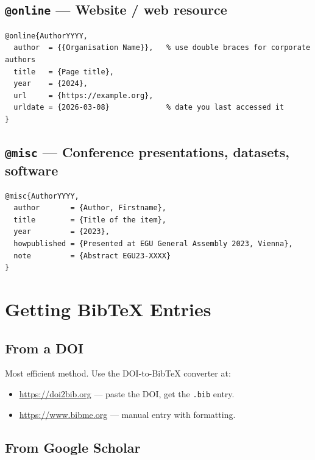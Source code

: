 \documentclass[11pt, a4paper]{article}
\begin{document}
\subsection{\texttt{@online} --- Website / web resource}

\begin{lstlisting}
@online{AuthorYYYY,
  author  = {{Organisation Name}},   % use double braces for corporate authors
  title   = {Page title},
  year    = {2024},
  url     = {https://example.org},
  urldate = {2026-03-08}             % date you last accessed it
}
\end{lstlisting}

\subsection{\texttt{@misc} --- Conference presentations, datasets, software}

\begin{lstlisting}
@misc{AuthorYYYY,
  author       = {Author, Firstname},
  title        = {Title of the item},
  year         = {2023},
  howpublished = {Presented at EGU General Assembly 2023, Vienna},
  note         = {Abstract EGU23-XXXX}
}
\end{lstlisting}

\section{Getting BibTeX Entries}

\subsection{From a DOI}

Most efficient method. Use the DOI-to-BibTeX converter at:
\begin{itemize}
  \item \url{https://doi2bib.org} --- paste the DOI, get the \texttt{.bib} entry.
  \item \url{https://www.bibme.org} --- manual entry with formatting.
\end{itemize}

\subsection{From Google Scholar}
\end{document}
